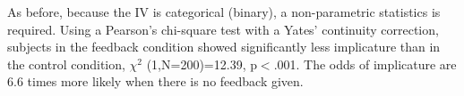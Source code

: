 As before, because the IV is categorical (binary), a non-parametric statistics is required. Using a Pearson's chi-square test with a Yates' continuity correction, subjects in the feedback condition showed significantly less implicature than in the control condition,  $\chi^2$ (1,N=200)=12.39, p$<$.001. The odds of implicature are 6.6 times more likely when there is no feedback given.